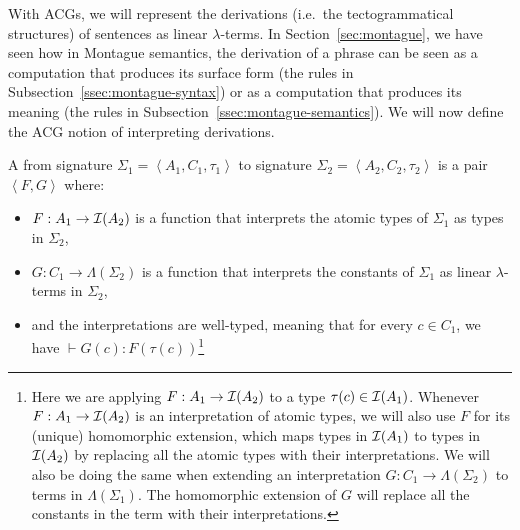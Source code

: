 With ACGs, we will represent the derivations (i.e.\ the tectogrammatical
structures) of sentences as linear $\lambda$-terms. In
Section~\ref{sec:montague}, we have seen how in Montague semantics, the
derivation of a phrase can be seen as a computation that produces its
surface form (the rules in Subsection~\ref{ssec:montague-syntax}) or as a
computation that produces its meaning (the rules in
Subsection~\ref{ssec:montague-semantics}). We will now define the ACG
notion of interpreting derivations.

\begin{definition}
  A  from signature
  $\Sigma_1 = \left< A_1, C_1, \tau_1 \right>$ to signature
  $\Sigma_2 = \left< A_2, C_2, \tau_2 \right>$ is a pair
  $\left< F, G \right>$ where:

  \begin{itemize}
  \item $F : A_1 \to \mathcal{I}(A_2)$ is a function that interprets the atomic
    types of $\Sigma_1$ as types in $\Sigma_2$,
  \item $G : C_1 \to \Lambda(\Sigma_2)$ is a function that interprets the
    constants of $\Sigma_1$ as linear $\lambda$-terms in $\Sigma_2$,
  \item and the interpretations are well-typed, meaning that for every
    $c \in C_1$, we have $\vdash G(c) : F(\tau(c))$\footnote{Here we are
      applying $F : A_1 \to \mathcal{I}(A_2)$ to a type $\tau(c) \in
      \mathcal{I}(A_1)$. Whenever $F : A_1 \to \mathcal{I}(A_2)$ is an interpretation of
      atomic types, we will also use $F$ for its (unique) homomorphic
      extension, which maps types in $\mathcal{I}(A_1)$ to types in $\mathcal{I}(A_2)$ by
      replacing all the atomic types with their interpretations. We will
      also be doing the same when extending an interpretation
      $G : C_1 \to \Lambda(\Sigma_2)$ to terms in $\Lambda(\Sigma_1)$. The
      homomorphic extension of $G$ will replace all the constants in the
      term with their interpretations.}
  \end{itemize}
\end{definition}

